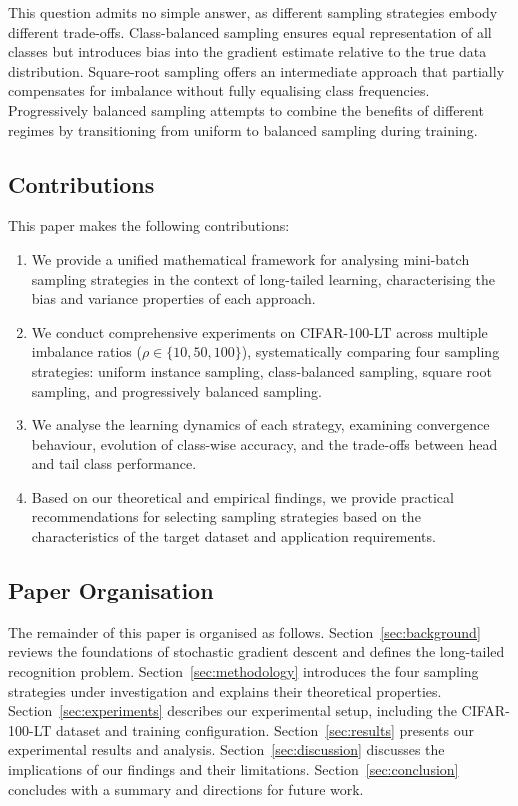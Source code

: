 \documentclass[12pt,a4paper]{article}
\begin{document}
This question admits no simple answer, as different sampling strategies embody different trade-offs. Class-balanced sampling ensures equal representation of all classes but introduces bias into the gradient estimate relative to the true data distribution. Square-root sampling offers an intermediate approach that partially compensates for imbalance without fully equalising class frequencies. Progressively balanced sampling attempts to combine the benefits of different regimes by transitioning from uniform to balanced sampling during training.

\subsection{Contributions}

This paper makes the following contributions:

\begin{enumerate}[leftmargin=*]
    \item We provide a unified mathematical framework for analysing mini-batch sampling strategies in the context of long-tailed learning, characterising the bias and variance properties of each approach.
    
    \item We conduct comprehensive experiments on CIFAR-100-LT across multiple imbalance ratios ($\rho \in \{10, 50, 100\}$), systematically comparing four sampling strategies: uniform instance sampling, class-balanced sampling, square root sampling, and progressively balanced sampling.
    
    \item We analyse the learning dynamics of each strategy, examining convergence behaviour, evolution of class-wise accuracy, and the trade-offs between head and tail class performance.
    
    \item Based on our theoretical and empirical findings, we provide practical recommendations for selecting sampling strategies based on the characteristics of the target dataset and application requirements.
\end{enumerate}

\subsection{Paper Organisation}

The remainder of this paper is organised as follows. Section~\ref{sec:background} reviews the foundations of stochastic gradient descent and defines the long-tailed recognition problem. Section~\ref{sec:methodology} introduces the four sampling strategies under investigation and explains their theoretical properties. Section~\ref{sec:experiments} describes our experimental setup, including the CIFAR-100-LT dataset and training configuration. Section~\ref{sec:results} presents our experimental results and analysis. Section~\ref{sec:discussion} discusses the implications of our findings and their limitations. Section~\ref{sec:conclusion} concludes with a summary and directions for future work.
\end{document}
